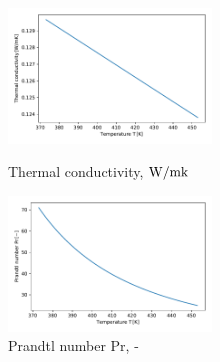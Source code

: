 \documentclass[conference]{IEEEtran}
\begin{document}
\begin{figure}[h]
\begin{minipage}{0.48\linewidth}
 \includegraphics[width=0.48\textwidth,natwidth=190,natheight=210]{fig/thermal_conductivity.pdf}
 \vspace{-1zh}
 \caption{Thermal conductivity, $\rm W / m k$}\label{thermal_conductivity}
\end{minipage}
\hfill
\begin{minipage}{0.48\linewidth}
 \includegraphics[width=0.48\textwidth,natwidth=190,natheight=210]{fig/prandtl_number.pdf}
 \vspace{-1zh}
 \caption{Prandtl number Pr, -}\label{prandtl_number}
\end{minipage}
\end{figure}

\end{document}
